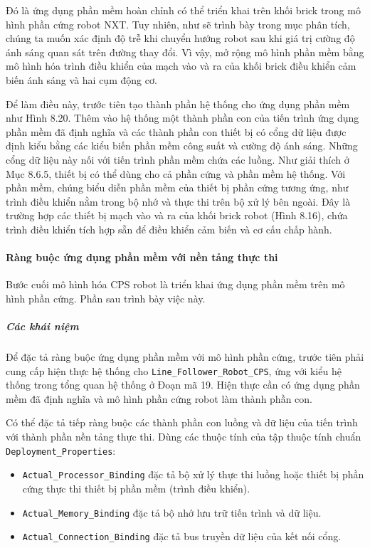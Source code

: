 Đó là ứng dụng phần mềm hoàn chỉnh có thể triển khai trên khối brick trong mô hình phần cứng robot NXT. Tuy nhiên, như sẽ trình bày trong mục phân tích, chúng ta muốn xác định độ trễ khi chuyển hướng robot sau khi giá trị cường độ ánh sáng quan sát trên đường thay đổi. Vì vậy, mở rộng mô hình phần mềm bằng mô hình hóa trình điều khiển của mạch vào và ra của khối brick điều khiển cảm biến ánh sáng và hai cụm động cơ.

Để làm điều này, trước tiên tạo thành phần hệ thống cho ứng dụng phần mềm như Hình 8.20. Thêm vào hệ thống một thành phần con của tiến trình ứng dụng phần mềm đã định nghĩa và các thành phần con thiết bị có cổng dữ liệu được định kiểu bằng các kiểu biến phần mềm công suất và cường độ ánh sáng. Những cổng dữ liệu này nối với tiến trình phần mềm chứa các luồng. Như giải thích ở Mục 8.6.5, thiết bị có thể dùng cho cả phần cứng và phần mềm hệ thống. Với phần mềm, chúng biểu diễn phần mềm của thiết bị phần cứng tương ứng, như trình điều khiển nằm trong bộ nhớ và thực thi trên bộ xử lý bên ngoài. Đây là trường hợp các thiết bị mạch vào và ra của khối brick robot (Hình 8.16), chứa trình điều khiển tích hợp sẵn để điều khiển cảm biến và cơ cấu chấp hành.

\paragraph{Ràng buộc ứng dụng phần mềm với nền tảng thực thi}
Bước cuối mô hình hóa CPS robot là triển khai ứng dụng phần mềm trên mô hình phần cứng. Phần sau trình bày việc này.

\subparagraph{Các khái niệm}
Để đặc tả ràng buộc ứng dụng phần mềm với mô hình phần cứng, trước tiên phải cung cấp hiện thực hệ thống cho \texttt{Line\_Follower\_Robot\_CPS}, ứng với kiểu hệ thống trong tổng quan hệ thống ở Đoạn mã 19. Hiện thực cần có ứng dụng phần mềm đã định nghĩa và mô hình phần cứng robot làm thành phần con.

Có thể đặc tả tiếp ràng buộc các thành phần con luồng và dữ liệu của tiến trình với thành phần nền tảng thực thi. Dùng các thuộc tính của tập thuộc tính chuẩn \texttt{Deployment\_Properties}:
\begin{itemize}
\item \texttt{Actual\_Processor\_Binding} đặc tả bộ xử lý thực thi luồng hoặc thiết bị phần cứng thực thi thiết bị phần mềm (trình điều khiển).
\item \texttt{Actual\_Memory\_Binding} đặc tả bộ nhớ lưu trữ tiến trình và dữ liệu.
\item \texttt{Actual\_Connection\_Binding} đặc tả bus truyền dữ liệu của kết nối cổng.
\end{itemize}

